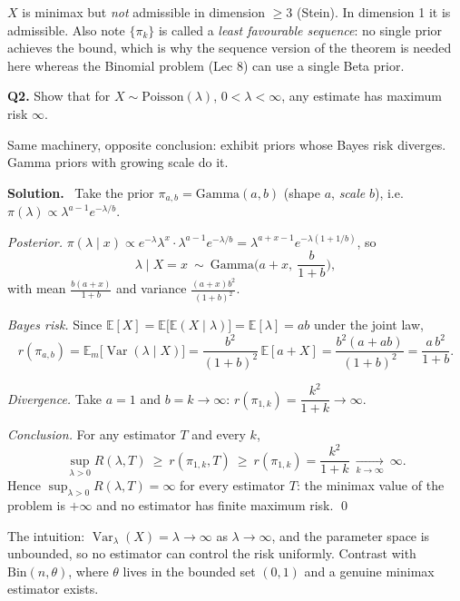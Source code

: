 \documentclass[11pt]{article}
\newcommand{\E}{\mathbb{E}}
\newcommand{\Var}{\operatorname{Var}}
\newenvironment{prob}[1]{\medskip\noindent\textbf{\large #1}\quad}{\par}
\newcommand{\soln}{\medskip\noindent\textbf{Solution.}\ }
\begin{document}
\begin{notebox}
$X$ is minimax but \emph{not} admissible in dimension $\ge3$ (Stein). In dimension 1 it is
admissible. Also note $\{\pi_k\}$ is called a \emph{least favourable sequence}: no single
prior achieves the bound, which is why the sequence version of the theorem is needed here
whereas the Binomial problem (Lec 8) can use a single Beta prior.
\end{notebox}

\bigskip
\begin{prob}{Q2.}
Show that for $X\sim\mathrm{Poisson}(\lambda)$, $0<\lambda<\infty$, any estimate has maximum
risk $\infty$.
\end{prob}

\begin{ideabox}
Same machinery, opposite conclusion: exhibit priors whose Bayes risk diverges. Gamma priors
with growing scale do it.
\end{ideabox}

\soln
Take the prior $\pi_{a,b}=\mathrm{Gamma}(a,b)$ (shape $a$, \emph{scale} $b$), i.e.\
$\pi(\lambda)\propto\lambda^{a-1}e^{-\lambda/b}$.

\emph{Posterior.} $\pi(\lambda\mid x)\propto e^{-\lambda}\lambda^{x}\cdot\lambda^{a-1}e^{-\lambda/b}
=\lambda^{a+x-1}e^{-\lambda(1+1/b)}$, so
\[
\lambda\mid X=x\ \sim\ \mathrm{Gamma}\Big(a+x,\ \frac{b}{1+b}\Big),
\]
with mean $\frac{b(a+x)}{1+b}$ and variance $\frac{(a+x)b^2}{(1+b)^2}$.

\emph{Bayes risk.} Since $\E[X]=\E\big[\E(X\mid\lambda)\big]=\E[\lambda]=ab$ under the joint
law,
\[
r(\pi_{a,b})=\E_m\big[\Var(\lambda\mid X)\big]
=\frac{b^2}{(1+b)^2}\,\E[a+X]=\frac{b^2(a+ab)}{(1+b)^2}
=\frac{a\,b^2}{1+b}.
\]

\emph{Divergence.} Take $a=1$ and $b=k\to\infty$: $r(\pi_{1,k})=\dfrac{k^2}{1+k}\to\infty$.

\emph{Conclusion.} For any estimator $T$ and every $k$,
\[
\sup_{\lambda>0}R(\lambda,T)\ \ge\ r(\pi_{1,k},T)\ \ge\ r(\pi_{1,k})=\frac{k^2}{1+k}
\ \xrightarrow[k\to\infty]{}\ \infty .
\]
Hence $\sup_{\lambda>0}R(\lambda,T)=\infty$ for every estimator $T$: the minimax value of the
problem is $+\infty$ and no estimator has finite maximum risk. \qed

\begin{notebox}
The intuition: $\Var_\lambda(X)=\lambda\to\infty$ as $\lambda\to\infty$, and the parameter
space is unbounded, so no estimator can control the risk uniformly. Contrast with
$\mathrm{Bin}(n,\theta)$, where $\theta$ lives in the bounded set $(0,1)$ and a genuine
minimax estimator exists.
\end{notebox}
\end{document}

